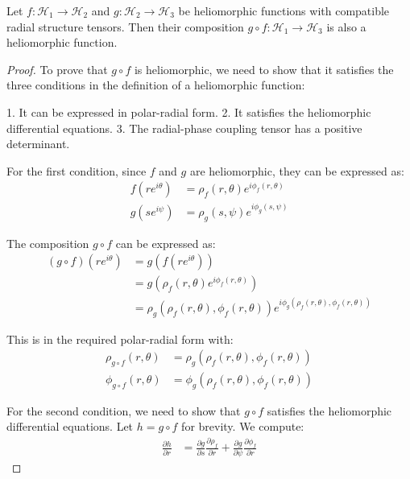 \begin{theorem}
\label{thm:heliomorphic_preservation}
Let $f: \mathcal{H}_1 \rightarrow \mathcal{H}_2$ and $g: \mathcal{H}_2 \rightarrow \mathcal{H}_3$ be heliomorphic functions with compatible radial structure tensors. Then their composition $g \circ f: \mathcal{H}_1 \rightarrow \mathcal{H}_3$ is also a heliomorphic function.
\end{theorem}

\begin{proof}
To prove that $g \circ f$ is heliomorphic, we need to show that it satisfies the three conditions in the definition of a heliomorphic function:

1. It can be expressed in polar-radial form.
2. It satisfies the heliomorphic differential equations.
3. The radial-phase coupling tensor has a positive determinant.

For the first condition, since $f$ and $g$ are heliomorphic, they can be expressed as:
\begin{align}
f(re^{i\theta}) &= \rho_f(r,\theta)e^{i\phi_f(r,\theta)}\\
g(se^{i\psi}) &= \rho_g(s,\psi)e^{i\phi_g(s,\psi)}
\end{align}

The composition $g \circ f$ can be expressed as:
\begin{align}
(g \circ f)(re^{i\theta}) &= g(f(re^{i\theta}))\\
&= g(\rho_f(r,\theta)e^{i\phi_f(r,\theta)})\\
&= \rho_g(\rho_f(r,\theta), \phi_f(r,\theta))e^{i\phi_g(\rho_f(r,\theta), \phi_f(r,\theta))}
\end{align}

This is in the required polar-radial form with:
\begin{align}
\rho_{g \circ f}(r,\theta) &= \rho_g(\rho_f(r,\theta), \phi_f(r,\theta))\\
\phi_{g \circ f}(r,\theta) &= \phi_g(\rho_f(r,\theta), \phi_f(r,\theta))
\end{align}

For the second condition, we need to show that $g \circ f$ satisfies the heliomorphic differential equations. Let $h = g \circ f$ for brevity. We compute:
\begin{align}
\frac{\partial h}{\partial r} &= \frac{\partial g}{\partial s}\frac{\partial \rho_f}{\partial r} + \frac{\partial g}{\partial \psi}\frac{\partial \phi_f}{\partial r}
\end{align}


\end{proof}
